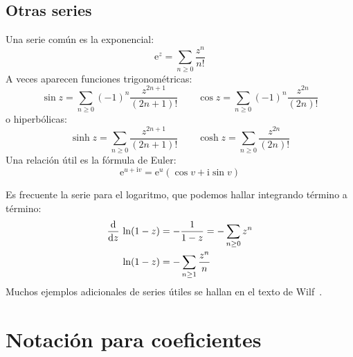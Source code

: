 \subsection{Otras series}
\label{sec:otras-series}

  Una serie común es la exponencial:%
  \begin{equation}
    \label{eq:exponencial}
    \mathrm{e}^z
      = \sum_{n \ge 0} \frac{z^n}{n!}
  \end{equation}
  A veces aparecen funciones trigonométricas:%
  \begin{equation*}
    \sin z
      = \sum_{n \ge 0} (-1)^n \frac{z^{2 n + 1}}{(2 n + 1)!} \qquad
    \cos z
      = \sum_{n \ge 0} (-1)^n \frac{z^{2 n}}{(2 n)!}
  \end{equation*}
  o hiperbólicas:%
  \begin{equation*}
    \sinh z
      = \sum_{n \ge 0} \frac{z^{2 n + 1}}{(2 n + 1)!} \qquad
    \cosh z
      = \sum_{n \ge 0} \frac{z^{2 n}}{(2 n)!}
  \end{equation*}
  Una relación útil es la fórmula de Euler:%
  \begin{equation}
    \label{eq:formula-Euler-exponencial}
    \mathrm{e}^{u + \mathrm{i} v}
      = \mathrm{e}^u (\cos v + \mathrm{i} \sin v)
  \end{equation}

  Es frecuente la serie para el logaritmo,%
  que podemos hallar integrando término a término:
  \begin{align}
    \frac{\mathrm{d}}{\mathrm{d} z} \, \ln (1 - z)
      &= - \frac{1}{1 - z}
       = - \sum_{n \ge 0} z^n \notag \\
    \ln (1 - z)
      &= - \sum_{n \ge 1} \frac{z^n}{n}
           \label{eq:ln(1-z)}
  \end{align}
  Muchos ejemplos adicionales de series útiles
  se hallan en el texto de Wilf~\cite{wilf06:_gfology}.

\section{Notación para coeficientes}
\label{sec:funciones-generatrices:notacion}

